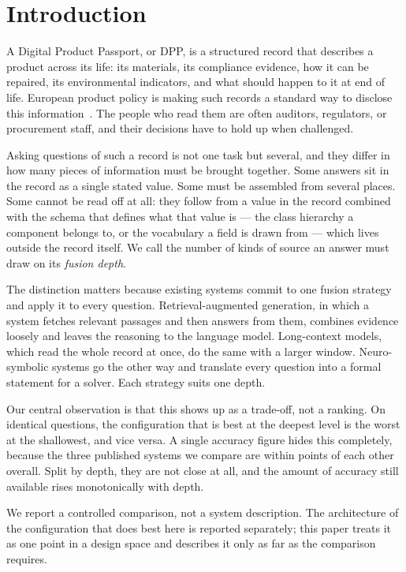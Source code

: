 \documentclass[conference]{IEEEtran}
\begin{document}
\section{Introduction}
A Digital Product Passport, or DPP, is a structured record that describes a
product across its life: its materials, its compliance evidence, how it can be
repaired, its environmental indicators, and what should happen to it at end of
life. European product policy is making such records a standard way to disclose
this information~\cite{eu2024espr}. The people who read them are often auditors,
regulators, or procurement staff, and their decisions have to hold up when
challenged.

Asking questions of such a record is not one task but several, and they differ
in how many pieces of information must be brought together. Some answers sit in
the record as a single stated value. Some must be assembled from several places.
Some cannot be read off at all: they follow from a value in the record combined
with the schema that defines what that value is --- the class hierarchy a
component belongs to, or the vocabulary a field is drawn from --- which lives
outside the record itself. We call the number of kinds of source an answer must
draw on its \emph{fusion depth}.

The distinction matters because existing systems commit to one fusion strategy
and apply it to every question. Retrieval-augmented generation, in which a
system fetches relevant passages and then answers from them, combines evidence
loosely and leaves the reasoning to the language model. Long-context models,
which read the whole record at once, do the same with a larger window.
Neuro-symbolic systems go the other way and translate every question into a
formal statement for a solver. Each strategy suits one depth.

Our central observation is that this shows up as a trade-off, not a ranking. On
identical questions, the configuration that is best at the deepest level is the
worst at the shallowest, and vice versa. A single accuracy figure hides this
completely, because the three published systems we compare are within
\SpreadOverall{} points of each other overall. Split by depth, they are not
close at all, and the amount of accuracy still available rises monotonically
with depth.

We report a controlled comparison, not a system description. The architecture of
the configuration that does best here is reported separately; this paper treats
it as one point in a design space and describes it only as far as the comparison
requires.
\end{document}
